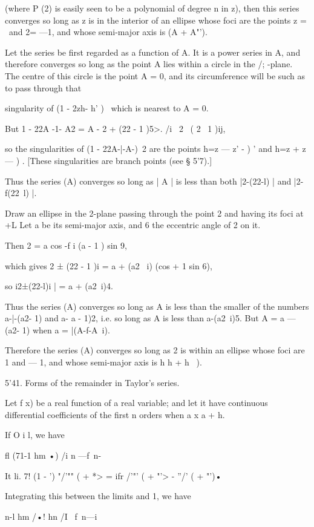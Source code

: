 {{(where P (2) is easily seen to be a polynomial of degree n in z), then
this series converges so long as z is in the interior of an ellipse
whose foci are the points z = \ and 2= —1, and whose semi-major axis
is (A + A"').

Let the series be first regarded as a function of A. It is a power
series in A, and therefore converges so long as the point A lies
within a circle in the /; -plane. The centre of this circle is the
point A = 0, and its circumference will be such as to pass through
that

singularity of (1 - 2zh- h' )~ which is nearest to A = 0.

But 1 - 22A -1- A2 = A - 2 + (22 - 1 )5>. /i \ 2 \ ( 2 \ 1 )ij,

so the singularities of (1 - 22A-|-A-)~2 are the points h=z — z' - ) '
and h=z + z — ) . [These singularities are branch points (see § 5'7).]

Thus the series (A) converges so long as | A | is less than both
|2-(22-l) | and |2-f(22\ l) |.

Draw an ellipse in the 2-plane passing through the point 2 and having
its foci at +L Let a be its semi-major axis, and 6 the eccentric angle
of 2 on it.

Then 2 = a cos -f i (a - 1 ) sin 9,

which gives 2 ± (22 - 1 )i = a + (a2 \ i) (cos + 1 sin 6),

so i2±(22-l)i | = a + (a2\ i)4.

Thus the series (A) converges so long as A is less than the smaller of
the numbers a-|-(a2- 1) and a- a - 1)2, i.e. so long as A is less than
a-(a2\ i)5. But A = a — (a2- 1) when a = |(A-f-A~i).

Therefore the series (A) converges so long as 2 is within an ellipse
whose foci are 1 and — 1, and whose semi-major axis is h h + h~ ).

5'41. Forms of the remainder in Taylor's series.

Let f x) be a real function of a real variable; and let it have
continuous differential coefficients of the first n orders when a x a
+ h.

If O i l, we have

fl (71-1 hm •) /i n —f\ n-\

It li. 7! (1 - ') "/'"" ( + *> = ifr /'"' ( + "'> - ''/' ( + "')•

Integrating this between the limits and 1, we have

n-l hm /•! hn /I \ f\ n—i

}}
